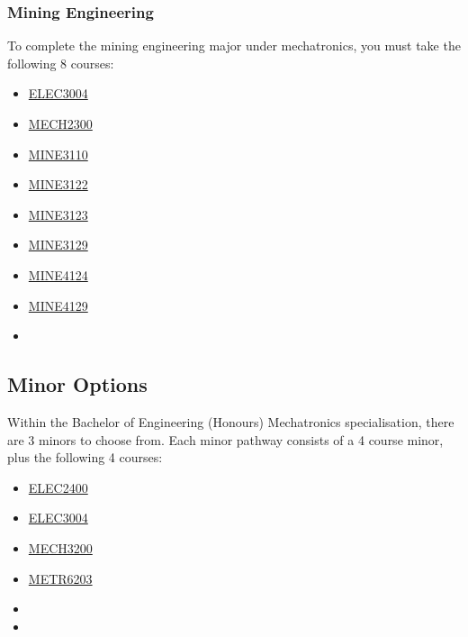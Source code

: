 \documentclass[a4paper,12pt]{report}
\begin{document}
\subsubsection{Mining Engineering}
To complete the mining engineering major under mechatronics, you must take the following 8 courses:
\begin{multicols}{3}
    \begin{itemize}
        \item \hyperlink{ELEC3004}{ELEC3004}
        \item \hyperlink{MECH2300}{MECH2300}
        \item \hyperlink{MINE3110}{MINE3110}
        \item \hyperlink{MINE3122}{MINE3122}
        \item \hyperlink{MINE3123}{MINE3123}
        \item \hyperlink{MINE3129}{MINE3129}
        \item \hyperlink{MINE4124}{MINE4124}
        \item \hyperlink{MINE4129}{MINE4129}
        \item[]
    \end{itemize}
\end{multicols}

\subsection{Minor Options}
Within the Bachelor of Engineering (Honours) Mechatronics specialisation, there are 3 minors to choose from. Each minor pathway consists of a 4 course minor, plus the following 4 courses:
\begin{multicols}{3}
    \begin{itemize}
        \item \hyperlink{ELEC2400}{ELEC2400}
        \item \hyperlink{ELEC3004}{ELEC3004}
        \item \hyperlink{MECH3200}{MECH3200}
        \item \hyperlink{METR6203}{METR6203}
        \item[]
        \item[]
    \end{itemize}
\end{multicols}
\end{document}
